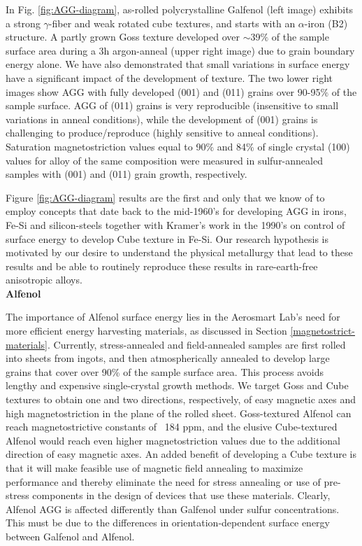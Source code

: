 In Fig. \ref{fig:AGG-diagram}, as-rolled polycrystalline Galfenol (left image) exhibits a strong $\gamma$-fiber and weak rotated cube textures, and starts with an $\alpha$-iron (B2) structure. A partly grown Goss texture developed over $\sim$39$\%$ of the sample surface area during a 3h argon-anneal (upper right image) due to grain boundary energy alone. We have also demonstrated that small variations in surface energy have a significant impact of the development of texture.\cite{Chun2010,Na2012b} The two lower right images show AGG with fully developed \hkl(001) and \hkl(011) grains over 90-95$ \% $ of the sample surface. AGG of (011) grains is very reproducible (insensitive to small variations in anneal conditions), while the development of (001) grains is challenging to produce/reproduce (highly sensitive to anneal conditions). Saturation magnetostriction values equal to 90$ \% $ and 84$ \% $ of single crystal \hkl(100) values for alloy of the same composition were measured in sulfur-annealed samples with \hkl(001) and \hkl(011) grain growth, respectively.  


Figure \ref{fig:AGG-diagram} results are the first and only that we know of to employ concepts that date back to the mid-1960’s \cite{Walter1965,dunn1962surface,waeckerle1993effect} for developing AGG in irons, Fe-Si and silicon-steels together with Kramer’s work in the 1990’s\cite{Kramer1992} on control of surface energy to develop Cube texture in Fe-Si. Our research hypothesis is motivated by our desire to understand the physical metallurgy that lead to these results and be able to routinely reproduce these results in rare-earth-free anisotropic alloys. \\
\textbf{Alfenol}

The importance of Alfenol surface energy lies in the Aerosmart Lab's need for more efficient energy harvesting materials, as discussed in Section \ref{magnetostrict-materials}. Currently, stress-annealed and field-annealed samples are first rolled into sheets from ingots, and then atmospherically annealed to develop large grains that cover over 90\% of the sample surface area. This process avoids lengthy and expensive single-crystal growth methods. We target Goss  and Cube  textures to obtain one and two directions, respectively, of easy magnetic axes and high magnetostriction in the plane of the rolled sheet. Goss-textured Alfenol can reach magnetostrictive constants of ~184 ppm, and the elusive Cube-textured Alfenol would reach even higher magnetostriction values due to the additional direction of easy magnetic axes. An added benefit of developing a Cube texture is that it will make feasible use of magnetic field annealing to maximize performance\cite{Yoo2009,Yoo2008} and thereby eliminate the need for stress annealing or use of pre-stress components in the design of devices that use these materials\cite{Restorff2006,Summers2009}. Clearly, Alfenol AGG is affected differently than Galfenol under sulfur concentrations. This must be due to the differences in orientation-dependent surface energy between Galfenol and Alfenol.
	

